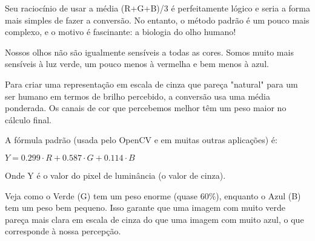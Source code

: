 \documentclass[12pt, a4paper]{article}
\begin{document}
Seu raciocínio de usar a média (R+G+B)/3 é perfeitamente lógico e seria a forma mais simples de fazer a conversão. No entanto, o método padrão é um pouco mais complexo, e o motivo é fascinante: a biologia do olho humano!

Nossos olhos não são igualmente sensíveis a todas as cores. Somos muito mais sensíveis à luz verde, um pouco menos à vermelha e bem menos à azul.

Para criar uma representação em escala de cinza que pareça "natural" para um ser humano em termos de brilho percebido, a conversão usa uma média ponderada. Os canais de cor que percebemos melhor têm um peso maior no cálculo final.

A fórmula padrão (usada pelo OpenCV e em muitas outras aplicações) é:

$Y=0.299⋅R+0.587⋅G+0.114⋅B$

Onde Y é o valor do pixel de luminância (o valor de cinza).

Veja como o Verde (G) tem um peso enorme (quase $60\%$), enquanto o Azul (B) tem um peso bem pequeno. Isso garante que uma imagem com muito verde pareça mais clara em escala de cinza do que uma imagem com muito azul, o que corresponde à nossa percepção.



\end{document}
